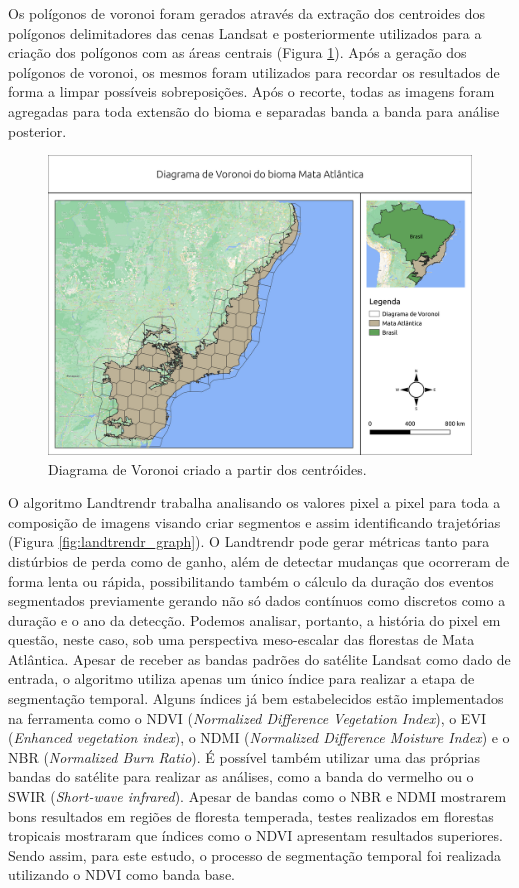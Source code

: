 Os polígonos de voronoi foram gerados através da extração dos centroides dos polígonos delimitadores das cenas Landsat e posteriormente utilizados para a criação dos polígonos com as áreas centrais (Figura \ref{fig:voronoi_ma}). Após a geração dos polígonos de voronoi, os mesmos foram utilizados para recordar os resultados de forma a limpar possíveis sobreposições. Após o recorte, todas as imagens foram agregadas para toda extensão do bioma e separadas banda a banda para análise posterior.

\begin{figure}[H]
    \centering
    \includegraphics[scale=.5]{images/voronoi_mata_atlantica.png}
    \caption{Diagrama de Voronoi criado a partir dos centróides.}
    \label{fig:voronoi_ma}
\end{figure}

O algoritmo Landtrendr trabalha analisando os valores pixel a pixel para toda a composição de imagens visando criar segmentos e assim identificando trajetórias (Figura \ref{fig:landtrendr_graph}). O Landtrendr pode gerar métricas tanto para distúrbios de perda como de ganho, além de detectar mudanças que ocorreram de forma lenta ou rápida, possibilitando também o cálculo da duração dos eventos segmentados previamente gerando não só dados contínuos como discretos como a duração e o ano da detecção. Podemos analisar, portanto, a história do pixel em questão, neste caso, sob uma perspectiva meso-escalar das florestas de Mata Atlântica. Apesar de receber as bandas padrões do satélite Landsat como dado de entrada, o algoritmo utiliza apenas um único índice para realizar a etapa de segmentação temporal. Alguns índices já bem estabelecidos estão implementados na ferramenta como o NDVI (\textit{Normalized Difference Vegetation Index}), o EVI (\textit{Enhanced vegetation index}), o NDMI (\textit{Normalized Difference Moisture Index}) e o NBR (\textit{Normalized Burn Ratio}). É possível também utilizar uma das próprias bandas do satélite para realizar as análises, como a banda do vermelho ou o SWIR (\textit{Short-wave infrared}). Apesar de bandas como o NBR e NDMI mostrarem bons resultados em regiões de floresta temperada, testes realizados em florestas tropicais mostraram que índices como o NDVI apresentam resultados superiores. Sendo assim, para este estudo, o processo de segmentação temporal foi realizada utilizando o NDVI como banda base.

